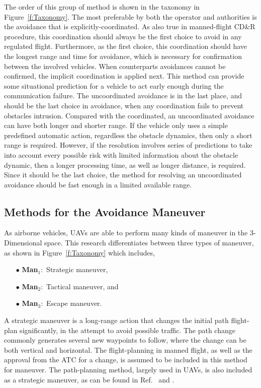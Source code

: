The order of this group of method is shown in the taxonomy in Figure~\ref{f:Taxonomy}. The most preferable by both the operator and authorities is the avoidance that is explicitly-coordinated. As also true in manned-flight CD\&R procedure, this coordination should always be the first choice to avoid in any regulated flight. Furthermore, as the first choice, this coordination should have the longest range and time for avoidance, which is necessary for confirmation between the involved vehicles. When counterparts avoidances cannot be confirmed, the implicit coordination is applied next. This method can provide some situational prediction for a vehicle to act early enough during the communication failure. The uncoordinated avoidance is in the last place, and should be the last choice in avoidance, when any coordination fails to prevent obstacles intrusion. Compared with the coordinated, an uncoordinated avoidance can have both longer and shorter range. If the vehicle only uses a simple predefined automatic action, regardless the obstacle dynamics, then only a short range is required. However, if the resolution involves series of predictions to take into account every possible risk with limited information about the obstacle dynamic, then a longer processing time, as well as longer distance, is required. Since it should be the last choice, the method for resolving an uncoordinated avoidance should be fast enough in a limited available range.

\subsection{Methods for the Avoidance Maneuver}
As airborne vehicles, UAVs are able to perform many kinds of maneuver in the 3-Dimensional space. This research differentiates between three types of maneuver, as shown in Figure~\ref{f:Taxonomy} which includes,
 
\begin{itemize}[labelindent=\parindent,leftmargin=5pc]
	\item[$\bullet$ \textbf{Man}$_1:$] Strategic maneuver, %
	\item[$\bullet$ \textbf{Man}$_2:$] Tactical maneuver, and %
	\item[$\bullet$ \textbf{Man}$_3:$] Escape maneuver.
\end{itemize}

A strategic maneuver is a long-range action that changes the initial path flight-plan significantly, in the attempt to avoid possible traffic. The path change commonly generates several new waypoints to follow, where the change can be both vertical and horizontal. The flight-planning in manned flight, as well as the approval from the ATC for a change, is assumed to be included in this method for maneuver. The path-planning method, largely used in UAVs, is also included as a strategic maneuver, as can be found in Ref.~\cite{Nikolos:03} and \cite{Borrelli:06}.

